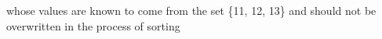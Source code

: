 \documentclass[preview]{standalone}
\begin{document}
\begin{center}
whose values are known to come from the set \{11, 12, 13\} and should not be \\ overwritten in the process of sorting
\end{center}
\end{document}
